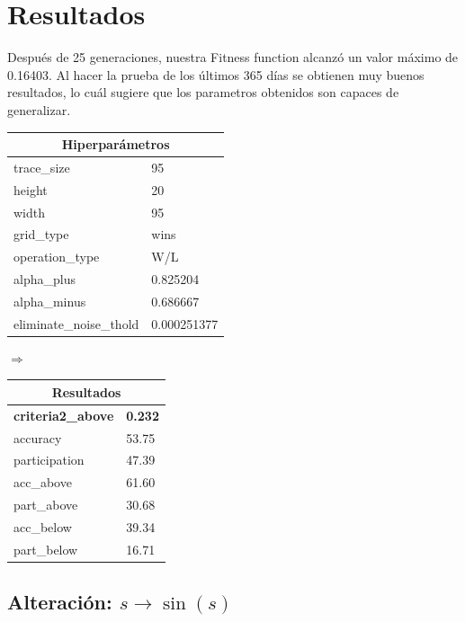 \documentclass[11pt]{article}
\begin{document}
\section{Resultados}
Después de 25 generaciones, nuestra Fitness function alcanzó un valor máximo de 0.16403. Al hacer la prueba de los últimos 365 días se obtienen muy buenos resultados, lo cuál sugiere que los parametros obtenidos son capaces de generalizar.
\begin{table}[H]
    \centering
    \begin{tabular}{|ll|}
        \hline
        \multicolumn{2}{|c|}{Hiperparámetros} \\
        \hline
        trace\_size            &           95 \\
        height                &           20 \\
        width                 &           95 \\
        grid\_type             &         wins \\
        operation\_type        &          W/L \\
        alpha\_plus            &     0.825204 \\
        alpha\_minus           &     0.686667 \\
        eliminate\_noise\_thold &  0.000251377 \\
        \hline
        \end{tabular}
    $\Rightarrow$
    \begin{tabular}{|ll|}
        \hline
        \multicolumn{2}{|c|}{Resultados}\\
        \hline
        \textbf{criteria2\_above}            &        \textbf{0.232} \\
        accuracy            &         53.75 \\
        participation                &          47.39 \\
        acc\_above                 &         61.60 \\
        part\_above             &       30.68 \\
        acc\_below        &        39.34 \\
        part\_below            &   16.71 \\
        \hline
        \end{tabular}
\end{table}



\subsection{Alteración: $s \to \sin(s)$}
\end{document}
